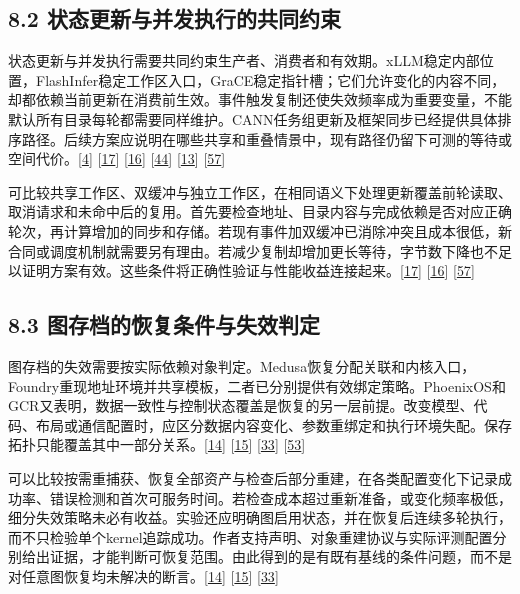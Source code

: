 \documentclass[
  11pt,
  UTF8]{ctexart}
\begin{document}
\hypertarget{section-8-2}{%
\subsection{8.2 状态更新与并发执行的共同约束}\label{section-8-2}}

状态更新与并发执行需要共同约束生产者、消费者和有效期。xLLM稳定内部位置，FlashInfer稳定工作区入口，GraCE稳定指针槽；它们允许变化的内容不同，却都依赖当前更新在消费前生效。事件触发复制还使失效频率成为重要变量，不能默认所有目录每轮都需要同样维护。CANN任务组更新及框架同步已经提供具体排序路径。后续方案应说明在哪些共享和重叠情景中，现有路径仍留下可测的等待或空间代价。{[}\protect\hyperlink{ref-liu2025xllm}{4}{]}
{[}\protect\hyperlink{ref-ye2025flashinfer}{17}{]}
{[}\protect\hyperlink{ref-ghosh2026grace}{16}{]}
{[}\protect\hyperlink{ref-ye2024chunkattention}{44}{]}
{[}\protect\hyperlink{ref-cann910update}{13}{]}
{[}\protect\hyperlink{ref-vllmascend0130impl}{57}{]}

可比较共享工作区、双缓冲与独立工作区，在相同语义下处理更新覆盖前轮读取、取消请求和未命中后的复用。首先要检查地址、目录内容与完成依赖是否对应正确轮次，再计算增加的同步和存储。若现有事件加双缓冲已消除冲突且成本很低，新合同或调度机制就需要另有理由。若减少复制却增加更长等待，字节数下降也不足以证明方案有效。这些条件将正确性验证与性能收益连接起来。{[}\protect\hyperlink{ref-ye2025flashinfer}{17}{]}
{[}\protect\hyperlink{ref-ghosh2026grace}{16}{]}
{[}\protect\hyperlink{ref-vllmascend0130impl}{57}{]}

\hypertarget{section-8-3}{%
\subsection{8.3 图存档的恢复条件与失效判定}\label{section-8-3}}

图存档的失效需要按实际依赖对象判定。Medusa恢复分配关联和内核入口，Foundry重现地址环境并共享模板，二者已分别提供有效绑定策略。PhoenixOS和GCR又表明，数据一致性与控制状态覆盖是恢复的另一层前提。改变模型、代码、布局或通信配置时，应区分数据内容变化、参数重绑定和执行环境失配。保存拓扑只能覆盖其中一部分关系。{[}\protect\hyperlink{ref-zeng2025medusa}{14}{]}
{[}\protect\hyperlink{ref-liu2026foundry}{15}{]}
{[}\protect\hyperlink{ref-wei2025phoenixos}{33}{]}
{[}\protect\hyperlink{ref-zeng2026gcr}{53}{]}

可以比较按需重捕获、恢复全部资产与检查后部分重建，在各类配置变化下记录成功率、错误检测和首次可服务时间。若检查成本超过重新准备，或变化频率极低，细分失效策略未必有收益。实验还应明确图启用状态，并在恢复后连续多轮执行，而不只检验单个kernel追踪成功。作者支持声明、对象重建协议与实际评测配置分别给出证据，才能判断可恢复范围。由此得到的是有既有基线的条件问题，而不是对任意图恢复均未解决的断言。{[}\protect\hyperlink{ref-zeng2025medusa}{14}{]}
{[}\protect\hyperlink{ref-liu2026foundry}{15}{]}
{[}\protect\hyperlink{ref-wei2025phoenixos}{33}{]}
\end{document}
